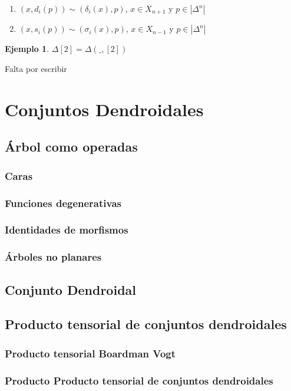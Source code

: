 \documentclass[11pt,a4paper,openright,oneside]{article}
\numberwithin{equation}{section}
\theoremstyle{definition}
\newtheorem{ex}[teo]{Ejemplo}
\begin{document}
\begin{enumerate}[(1)]
    \item $(x, d_i(p)) \sim (\delta_i(x), p)$, $x\in X_{n+1}$ y $p\in|\Delta^n|$
    \item $(x, s_i(p)) \sim (\sigma_i(x), p)$, $x\in X_{n-1}$ y $p\in|\Delta^n|$
\end{enumerate}

\begin{ex}
    $\Delta[2] = \Delta(\_, [2])$
\end{ex}
Falta por escribir


\section{Conjuntos Dendroidales}
\subsection{\'Arbol como operadas}
\subsubsection{Caras}
\subsubsection{Funciones degenerativas}
\subsubsection{Identidades de morfismos}
\subsubsection{\'Arboles no planares}
\subsection{Conjunto Dendroidal}
\subsection{Producto tensorial de conjuntos dendroidales}
\subsubsection{Producto tensorial Boardman Vogt}
\subsubsection{Producto Producto tensorial de conjuntos dendroidales}
\newpage
\end{document}

